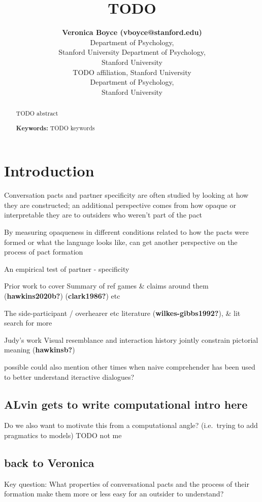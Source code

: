 \documentclass[10pt, letterpaper]{article}
\title{TODO}
\author{{\large \bf Veronica Boyce (vboyce@stanford.edu)} \\ Department of Psychology, \\Stanford University \And {\large \bf TODO (TODO email) } Department of Psychology, \\Stanford University \AND {\large \bf TODO (TODO email)} \\ TODO affiliation, Stanford University \And {\large \bf Michael C. Frank (mcfrank@stanford.edu)} \\ Department of Psychology, \\ Stanford University}
\begin{document}
\maketitle

\begin{abstract}
TODO abstract

\textbf{Keywords:}
TODO keywords
\end{abstract}

\section{Introduction}\label{introduction}

Conversation pacts and partner specificity are often studied by looking
at how they are constructed; an additional perspective comes from how
opaque or interpretable they are to outsiders who weren't part of the
pact

By measuring opaqueness in different conditions related to how the pacts
were formed or what the language looks like, can get another perspective
on the process of pact formation

An empirical test of partner - specificity

Prior work to cover Summary of ref games \& claims around them
(\textbf{hawkins2020b?}) (\textbf{clark1986?}) etc

The side-participant / overhearer etc literature
(\textbf{wilkes-gibbs1992?}), \& lit search for more

Judy's work Visual resemblance and interaction history jointly constrain
pictorial meaning (\textbf{hawkinsb?})

possible could also mention other times when naive comprehender has been
used to better understand iteractive dialogues?

\subsection{ALvin gets to write computational intro
here}\label{alvin-gets-to-write-computational-intro-here}

Do we also want to motivate this from a computational angle?
(i.e.~trying to add pragmatics to models) TODO not me

\subsection{back to Veronica}\label{back-to-veronica}

Key question: What properties of conversational pacts and the process of
their formation make them more or less easy for an outsider to
understand?
\end{document}
